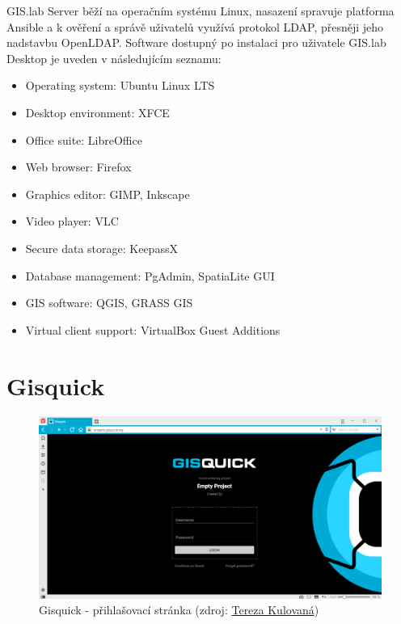 GIS.lab Server běží na operačním systému Linux, nasazení spravuje platforma Ansible a k ověření a správě uživatelů využívá protokol LDAP, přesněji jeho nadstavbu OpenLDAP. Software dostupný po instalaci pro uživatele GIS.lab Desktop je uveden v následujícím seznamu:
\begin{itemize}
\item Operating system: Ubuntu Linux LTS
\item Desktop environment: XFCE
\item Office suite: LibreOffice
\item Web browser: Firefox
\item Graphics editor: GIMP, Inkscape
\item Video player: VLC
\item Secure data storage: KeepassX
\item Database management: PgAdmin, SpatiaLite GUI
\item GIS software: QGIS, GRASS GIS
\item Virtual client support: VirtualBox Guest Additions
\end{itemize}

\section{Gisquick}
\label{gisquick}

\begin{figure}[H] \centering
    \includegraphics[width=400pt]{./pictures/gisquick-welcome-screen.png}
    \caption[Gisquick - přihlašovací stránka]{Gisquick - přihlašovací stránka (zdroj:
	\href{}{Tereza Kulovaná})}
    \label{fig:gisquick-welcome}
\end{figure}

